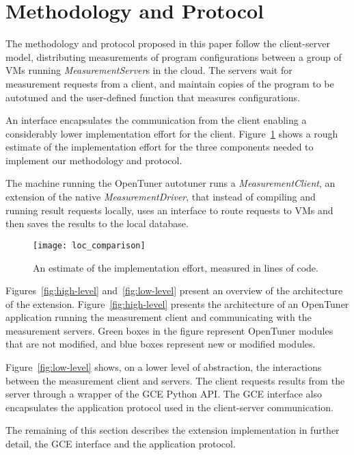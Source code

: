 \section{Methodology and Protocol}
\label{sec:ext}

The methodology and protocol proposed in this paper follow the client-server
model, distributing measurements of program configurations between a group of
VMs running \emph{MeasurementServer}s in the cloud. The servers
wait for measurement requests from a client, and maintain copies of the
program to be autotuned and the user-defined function that measures
configurations.

An interface encapsulates the communication
from the client enabling a considerably lower implementation
effort for the client. Figure~\ref{fig:loc-comp} shows a rough
estimate of the implementation effort for the three components
needed to implement our methodology and protocol.

The machine running the OpenTuner autotuner runs a \emph{MeasurementClient},
an extension of the native \emph{MeasurementDriver}, that instead of
compiling and running result requests locally, uses an interface to
route requests to VMs and then saves the results to the local
database. 

\begin{figure}[htpb]
    \centering
    \texttt{[image: loc\_comparison]}
    \caption{An estimate of the implementation effort, measured in lines of code.}
    \label{fig:loc-comp}
\end{figure}

Figures~\ref{fig:high-level} and~\ref{fig:low-level} present an
overview of the architecture of the extension.
Figure~\ref{fig:high-level} presents the architecture of an OpenTuner
application running the measurement client and communicating with the
measurement servers.  Green boxes in the figure represent OpenTuner modules
that are not modified, and blue boxes represent new or modified modules.

Figure~\ref{fig:low-level} shows, on a lower level of abstraction, the
interactions between the measurement client and servers. The client
requests results from the server through a wrapper of the GCE Python API.
The GCE interface also encapsulates the application protocol used in
the client-server communication.

The remaining of this section describes the extension implementation in further
detail, the GCE interface and the application protocol.


